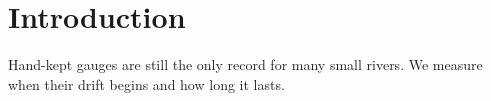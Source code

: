 \begin{abstract}
River gauges kept by hand drift in ways that daily averages hide, and the drift is largest in the weeks after a flood.
\end{abstract}
\section{Introduction}
Hand-kept gauges are still the only record for many small rivers. We measure when their drift begins and how long it lasts.
